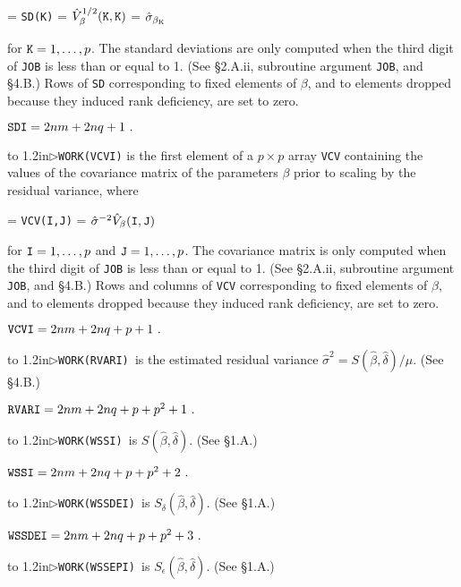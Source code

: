  = {\tt SD(K)} = $\hat{V}_\beta^{1/2}({\tt K, K})$ = $\hat{\sigma}_{\beta_{\rm K}}$

\aligntobox for ${\tt K} = 1,\ldots,p$. The standard deviations are only computed when the third digit of {\tt JOB} is less than or equal to 1. (See \S 2.A.ii, subroutine argument {\tt JOB}, and \S 4.B.) Rows of {\tt SD} corresponding to fixed elements of $\beta$, and to elements dropped because they induced rank deficiency, are set to zero.

\aligntobox ${\tt SDI} = 2nm + 2nq + 1\ .$
\bigskip

\hangindent\wd\mybox{}\noindent\hbox to 1.2in{$\triangleright$\hfil{\tt WORK(VCVI)} }is the first element of a $p \times p$ array {\tt VCV} containing the values of the covariance matrix of the parameters $\beta$ prior to scaling by the residual variance, where

 = {\tt VCV(I,J)} = $\hat{\sigma}^{-2}\hat{V}_\beta({\tt I,J})$

\aligntobox for ${\tt I} = 1,\ldots,p$ and ${\tt J} = 1,\ldots,p$. The covariance matrix is only computed when the third digit of {\tt JOB} is less than or equal to 1. (See \S 2.A.ii, subroutine argument {\tt JOB}, and \S 4.B.) Rows and columns of {\tt VCV} corresponding to fixed elements of $\beta$, and to elements dropped because they induced rank deficiency, are set to zero.

\aligntobox ${\tt VCVI} = 2nm + 2nq + p + 1\ .$
\bigskip

\hangindent\wd\mybox{}\noindent\hbox to 1.2in{$\triangleright$\hfill\tt WORK(RVARI) }is the estimated residual variance
$\hat{\sigma}^2=S(\hat{\beta},\hat{\delta})/\mu$. (See \S 4.B.)

\aligntobox ${\tt RVARI} = 2nm + 2nq + p + p^2 + 1\ .$
\bigskip

\hangindent\wd\mybox{}\noindent\hbox to
1.2in{$\triangleright$\hfill\tt WORK(WSSI) }is $S(\hat{\beta},\hat{\delta})$. (See \S 1.A.)

\aligntobox ${\tt WSSI} = 2nm + 2nq + p + p^2 + 2\ .$
\bigskip

\hangindent\wd\mybox{}\noindent\hbox to
1.2in{$\triangleright$\hfill\tt WORK(WSSDEI) }is $S_\delta(\hat{\beta},\hat{\delta})$. (See \S 1.A.)

\aligntobox ${\tt WSSDEI} = 2nm + 2nq + p + p^2 + 3\ .$
\bigskip

\hangindent\wd\mybox{}\noindent\hbox to
1.2in{$\triangleright$\hfill\tt WORK(WSSEPI) }is $S_\epsilon(\hat{\beta},\hat{\delta})$. (See \S 1.A.)

